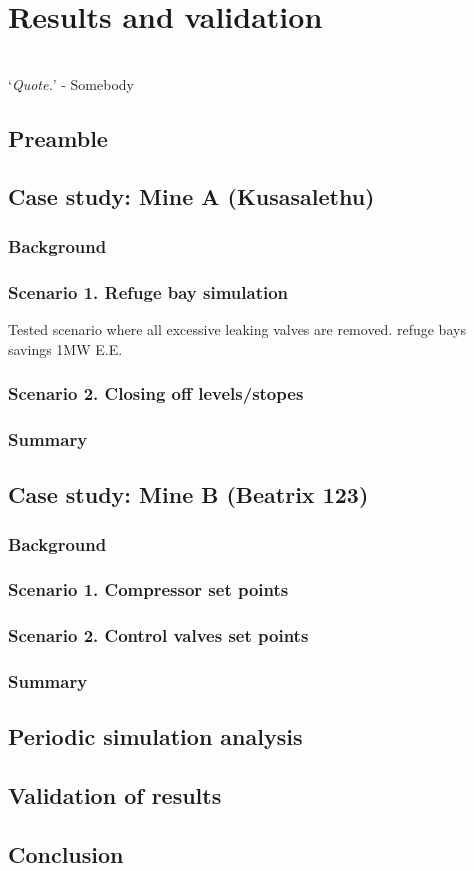 \chapter{Results and validation}
\thispagestyle{empty}
\vspace{38em}
\hrulefill
\\
\enquote*{\textit{Quote.}} - Somebody\\
\newpage
\section{Preamble}
\section{Case study: Mine A \color{blue}(Kusasalethu)}
	\subsection{Background}
	\subsection{Scenario 1. Refuge bay simulation}
	Tested scenario where all excessive leaking valves are removed.
	refuge bays savings 1MW E.E.
	\subsection{Scenario 2. Closing off levels/stopes}
	
	
	\subsection{Summary}
\section{Case study: Mine B \color{blue}(Beatrix 123)}
	\subsection{Background}
	\subsection{Scenario 1. Compressor set points}
	\subsection{Scenario 2. Control valves set points}
	\subsection{Summary}
\section{Periodic simulation analysis}
\section{Validation of results}
\section{Conclusion}